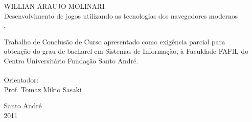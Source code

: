\thispagestyle{empty}

\vspace{3cm}
\begin{center}
WILLIAN ARAUJO MOLINARI \\
\vspace{4cm}
\huge Desenvolvimento de jogos utilizando as tecnologias dos navegadores modernos \\
\vspace{2.5cm}
\large.\\
\hspace{7cm} \begin{minipage}{0.5\textwidth}
Trabalho de Conclusão de Curso apresentado como exigência parcial para
obtenção do grau de bacharel em Sistemas de Informação, à Faculdade
FAFIL do Centro Universitário Fundação Santo André. \\
\\
Orientador: \\
Prof. Tomaz Mikio Sasaki
\end{minipage}
\vspace{6cm}

\large Santo André \\ 2011
\end{center}
